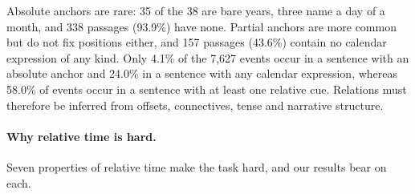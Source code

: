 \documentclass[11pt]{article}
\begin{document}
Absolute anchors are rare: 35 of the 38 are bare years, three name a day of a month, and 338 passages (93.9\%) have none. Partial anchors are more common but do not fix positions either, and 157 passages (43.6\%) contain no calendar expression of any kind. Only 4.1\% of the 7,627 events occur in a sentence with an absolute anchor and 24.0\% in a sentence with any calendar expression, whereas 58.0\% of events occur in a sentence with at least one relative cue. Relations must therefore be inferred from offsets, connectives, tense and narrative structure.

\paragraph{Why relative time is hard.}
Seven properties of relative time make the task hard, and our results bear on each.
\end{document}
